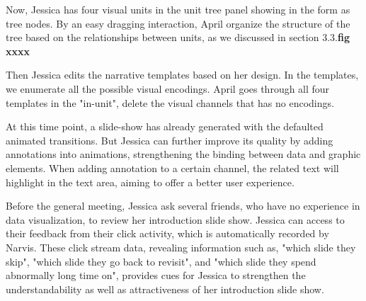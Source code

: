 Now, Jessica has four visual units in the unit tree panel showing in the form as tree nodes. By an easy dragging interaction, April organize the structure of the tree based on the relationships between units, as we discussed in section 3.3.\textbf{fig xxxx}

Then Jessica edits the narrative templates based on her design. In the templates, we enumerate all the possible visual encodings. April goes through all four templates in the "in-unit", delete the visual channels that has no encodings. 

At this time point, a slide-show has already generated with the defaulted animated transitions. But Jessica can further improve its quality by adding annotations into animations, strengthening the binding between data and graphic elements. 
When adding annotation to a certain channel, the related text will highlight in the text area, aiming to offer a better user experience.   


Before the general meeting, Jessica ask several friends, who have no experience in data visualization, to review her introduction slide show. Jessica can access to their feedback from their click activity, which is automatically recorded by Narvis. These click stream data, revealing information such as, "which slide they skip", "which slide they go back to revisit", and "which slide they spend abnormally long time on", provides cues for Jessica to strengthen the understandability as well as attractiveness of her introduction slide show.  